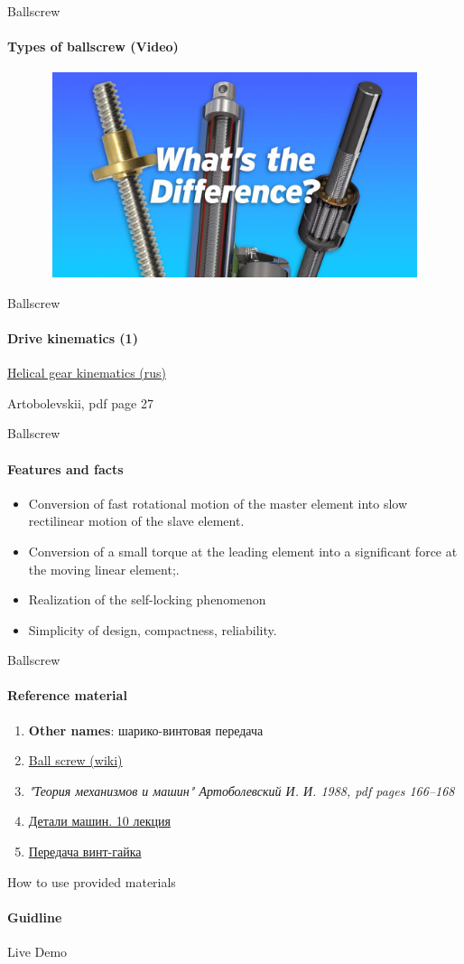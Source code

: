 \documentclass[aspectratio=169]{beamer}
\newcommand{\fbckg}[1]{\usebackgroundtemplate{\texttt{[image: \#1]}}}%
\begin{document}
\begin{frame}[t]{Ballscrew}
    \framesubtitle{Types of ballscrew (Video)}
    \vspace{-0.6cm}
    \begin{figure}[H]
        \href{https://youtu.be/1P6nbs1-4dQ}{
            \centering\includegraphics[height=6cm,width=1\textwidth,keepaspectratio]{ballscrew_types_preview.jpg}}
        \label{fig:ballscrew_types_preview.jpg}
    \end{figure}
\end{frame}

\begin{frame}[t]{Ballscrew}
    \framesubtitle{Drive kinematics (1)}
    \href{https://studfile.net/preview/4295396/page:16/}{Helical gear kinematics (rus)}
    
    Artobolevskii, pdf page 27
\end{frame}

\begin{frame}[t]{Ballscrew}
    \framesubtitle{Features and facts}
    \begin{itemize}
        \item Conversion of fast rotational motion of the master element into slow rectilinear motion of the slave element.
        \item Conversion of a small torque at the leading element into a significant force at the moving linear element;.
        \item Realization of the self-locking phenomenon
        \item Simplicity of design, compactness, reliability.
    \end{itemize}
\end{frame}

\begin{frame}[t]{Ballscrew}
    \framesubtitle{Reference material}
    \begin{enumerate}
        \item \textbf{Other names}: шарико-винтовая передача
        \item \href{https://en.wikipedia.org/wiki/Ball_screw}{Ball screw (wiki)}
        \item \textit{"Теория механизмов и машин" Артоболевский И. И. 1988, pdf pages 166--168 }
        \item \href{https://studfile.net/preview/2156460/}{Детали машин. 10 лекция}
        \item \href{https://youtu.be/kcrnG13NKCw}{Передача винт-гайка}
    \end{enumerate}
\end{frame}

\begin{frame}[c]{How to use provided materials}
\framesubtitle{Guidline}
    \Huge
    \centering
    Live Demo
\end{frame}


\fbckg{fibeamer/figs/last_page.png}
\frame[plain]{}
\end{document}

